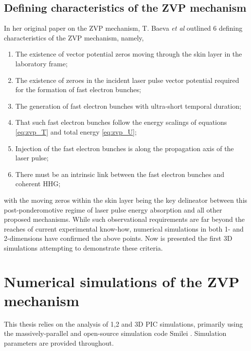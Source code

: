 \subsection{Defining characteristics of the ZVP mechanism}\label{sec:zvp-characteristics}
In her original paper on the ZVP mechanism, T. Baeva \textit{et al} \cite{baevaZeroVectorPotential2011} outlined 6 defining characteristics of the \ac{ZVP} mechanism, namely,
\begin{enumerate}
	\item The existence of vector potential zeros moving through the skin layer in the laboratory frame;
	\item The existence of zeroes in the incident laser pulse vector potential required for the formation of fast electron bunches;
	\item The generation of fast electron bunches with ultra-short temporal duration;
	\item That such fast electron bunches follow the energy scalings of equations \ref{eq:zvp_T} and total energy \ref{eq:zvp_U};
	\item Injection of the fast electron bunches is along the propagation axis of the laser pulse;
	\item There must be an intrinsic link between the fast electron bunches and coherent \ac{HHG};
\end{enumerate}
with the moving zeros within the skin layer being the key delineator between this post-ponderomotive regime of laser pulse energy absorption and all other proposed mechanisms. While such observational requirements are far beyond the reaches of current experimental know-how, numerical simulations in both 1- \cite{baevaZeroVectorPotential2011} and 2-dimensions \cite{savinAttosecondscaleAbsorptionExtreme2017} have confirmed the above points. Now is presented the first \ac{3D} simulations attempting to demonstrate these criteria.

\section{Numerical simulations of the ZVP mechanism}
This thesis relies on the analysis of 1,2 and 3D \ac{PIC} simulations, primarily using the massively-parallel and open-source simulation code Smilei \cite{derouillatSmileiCollaborativeOpensource2018}. Simulation parameters are provided throughout.

